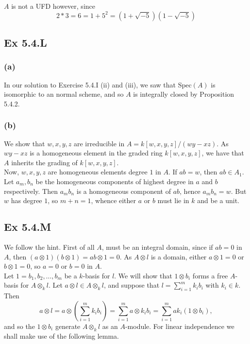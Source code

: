 \documentclass{article}
\theoremstyle{definition}
\newcommand{\Spec}{\text{Spec}}
\begin{document}
$A$ is not a UFD however, since
\[
	2 * 3 = 6 = 1 + 5^2 = (1 + \sqrt{-5})(1 - \sqrt{-5})
\]

\subsection*{Ex 5.4.L}

\subsubsection*{(a)}

In our solution to Exercise 5.4.I (ii) and (iii), we saw that $\Spec(A)$ is
isomorphic to an normal scheme, and so $A$ is integrally closed by Proposition
5.4.2.

\subsubsection*{(b)}

We show that $w,x,y,z$ are irreducible in $A = k[w,x,y,z]/(wy - xz)$. As $wy -
xz$ is a homogeneous element in the graded ring $k[w,x,y,z]$, we have that $A$
inherits the grading of $k[w,x,y,z]$. \\

Now, $w,x,y,z$ are homogeneous elements degree $1$ in $A$. If $ab = w$, then
$ab \in A_1$. Let $a_m, b_n$ be the homogeneous components of highest degree in
$a$ and $b$ respectively. Then $a_m b_n$ is a homogeneous component of $ab$,
hence $a_m b_n = w$. But $w$ has degree $1$, so $m + n = 1$, whence either $a$
or $b$ must lie in $k$ and be a unit. 

\subsection*{Ex 5.4.M}

We follow the hint. First of all $A$, must be an integral domain, since if $ab
= 0$ in $A$, then $(a \otimes 1)(b \otimes 1) = ab \otimes 1 = 0$. As $A
\otimes l$ is a domain, either $a \otimes 1 = 0$ or $b \otimes 1 = 0$, so $a =
0$ or $b = 0$ in $A$. \\

Let $1 = b_1, b_2, \ldots, b_m$ be a $k$-basis for $l$. We will show that $1
\otimes b_i$ forms a free $A$-basis for $A \otimes_{k} l$. Let $a \otimes l \in
A \otimes_{k} l$, and suppose that $l = \sum_{i = 1}^{m} k_i b_i$ with $k_i \in
k$. Then 
\[
	a \otimes l
	=
	a \otimes \left(\sum_{i = 1}^{m} k_i b_i\right)
	=
	\sum_{i = 1}^{m} a \otimes k_i b_i
	=
	\sum_{i = 1}^{m} a k_i (1 \otimes b_i),
\] 
and so the $1 \otimes b_i$ generate $A \otimes_{k} l$ as an $A$-module. For linear 
independence we shall make use of the following lemma.
\end{document}
